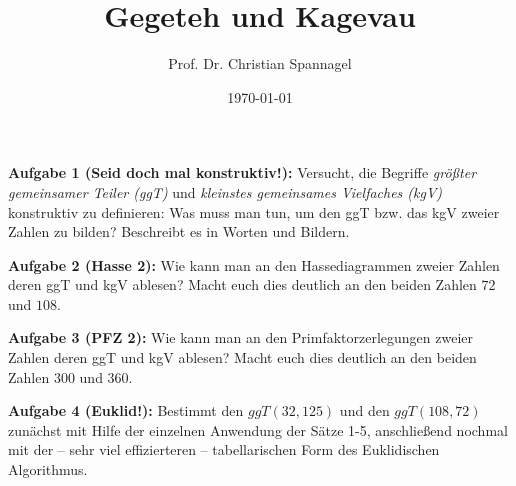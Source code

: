 \documentclass{cssheet}
\title{Gegeteh und Kagevau}
\author{Prof. Dr. Christian Spannagel}
\date{\today}
\begin{document}
\printtitle 

\vspace*{10mm}

\textbf{Aufgabe 1 (Seid doch mal konstruktiv!):}  Versucht, die Begriffe \emph{größter gemeinsamer Teiler (ggT)} und \emph{kleinstes gemeinsames Vielfaches (kgV)} konstruktiv zu definieren: Was muss man tun, um den ggT bzw. das kgV zweier Zahlen zu bilden? Beschreibt es in Worten und Bildern. 

\textbf{Aufgabe 2 (Hasse 2):} Wie kann man an den Hassediagrammen zweier Zahlen deren ggT und kgV ablesen? Macht euch dies deutlich an den beiden Zahlen $72$ und $108$.

\textbf{Aufgabe 3 (PFZ 2):}  Wie kann man an den Primfaktorzerlegungen zweier Zahlen deren ggT und kgV ablesen? Macht euch dies deutlich an den beiden Zahlen $300$ und $360$.
 
\textbf{Aufgabe 4 (Euklid!):}  
Bestimmt den $ggT(32,125)$ und den $ggT(108,72)$ zunächst mit Hilfe der einzelnen Anwendung der Sätze 1-5, anschließend nochmal mit der -- sehr viel effizierteren -- tabellarischen Form des Euklidischen Algorithmus. 

\vspace*{10mm}
\printlicense

\printsocials
\end{document}
